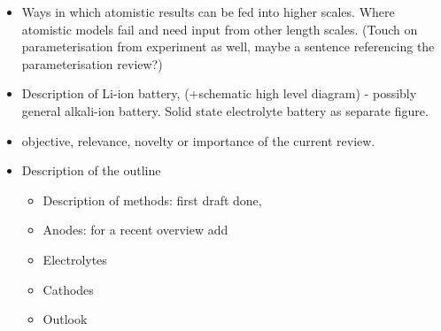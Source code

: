 \documentclass[../main.tex]{subfiles}
\begin{document}
\begin{itemize}
    \item Ways in which atomistic results can be fed into higher scales. Where atomistic models fail and need input from other length scales. (Touch on parameterisation from experiment as well, maybe a sentence referencing the parameterisation review?)
    \item \textbf{} Description of Li-ion battery, (+schematic high level diagram) - possibly general alkali-ion battery. Solid state electrolyte battery as separate figure.
    \item objective, relevance, novelty or importance of the current review.
    \item Description of the outline
        \begin{itemize}
           \item Description of methods: first draft done, 
           \item Anodes: for a recent overview add
           \item Electrolytes
           \item Cathodes
           \item Outlook
        \end{itemize}
\end{itemize}
\end{document}
